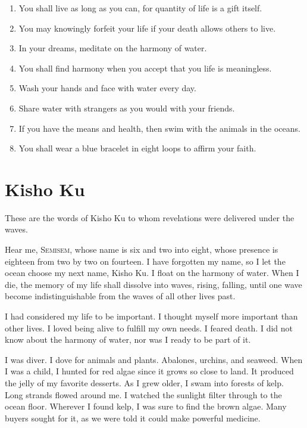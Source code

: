 \documentclass[12pt, letterpaper]{report}
\begin{document}
\begin{enumerate}
  \item You shall live as long as you can, for quantity of life is a gift itself.
  \item You may knowingly forfeit your life if your death allows others to live.
  \item In your dreams, meditate on the harmony of water.
  \item You shall find harmony when you accept that you life is meaningless.
  \item Wash your hands and face with water every day.
  \item Share water with strangers as you would with your friends.
  \item If you have the means and health, then swim with the animals in the oceans.
  \item You shall wear a blue bracelet in eight loops to affirm your faith.
\end{enumerate}

\chapter{Kisho Ku}

These are the words of Kisho Ku to whom revelations were delivered under the waves.

\vspace{1\baselineskip}
Hear me, S\textsc{emisem}, whose name is six and two into eight, whose presence is eighteen from two by two on fourteen. I have forgotten my name, so I let the ocean choose my next name, Kisho Ku. I float on the harmony of water. When I die, the memory of my life shall dissolve into waves, rising, falling, until one wave become indistinguishable from the waves of all other lives past.

\vspace{1\baselineskip}
I had considered my life to be important. I thought myself more important than other lives. I loved being alive to fulfill my own needs. I feared death. I did not know about the harmony of water, nor was I ready to be part of it.

\vspace{1\baselineskip}
I was diver. I dove for animals and plants. Abalones, urchins, and seaweed. When I was a child, I hunted for red algae since it grows so close to land. It produced the jelly of my favorite desserts. As I grew older, I swam into forests of kelp. Long strands flowed around me. I watched the sunlight filter through to the ocean floor. Wherever I found kelp, I was sure to find the brown algae. Many buyers sought for it, as we were told it could make powerful medicine. 
\end{document}
